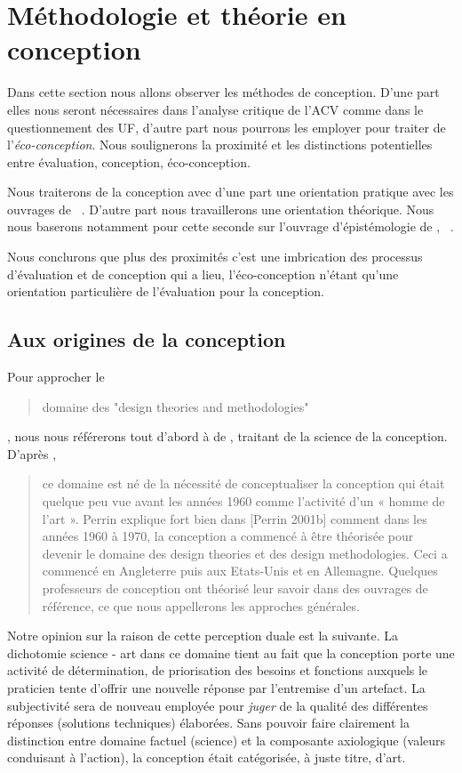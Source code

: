 \section{Méthodologie et théorie en conception}
\label{sec:Méthodologies et théorie de la conception}
Dans cette section nous allons observer les méthodes de conception.
D'une part elles nous seront nécessaires dans l'analyse critique de l'\gls{ACV} comme dans le questionnement des \gls{UF}, d'autre part nous pourrons les employer pour traiter de l'\emph{éco-conception}.
Nous soulignerons la proximité et les distinctions potentielles entre évaluation, conception, éco-conception.

Nous traiterons de la conception avec d'une part une orientation pratique avec les ouvrages de \cite{philippe_taillard_demarche_2010,tassinari_pratique_1997}~\citeauthor{philippe_taillard_demarche_2010,tassinari_pratique_1997}.
D'autre part nous travaillerons une orientation théorique.
Nous nous baserons notamment pour cette seconde sur l'ouvrage d'épistémologie de \citeauthor{micaelli_artificialisme:_2003}, ~\cite{micaelli_artificialisme:_2003}.

Nous conclurons que plus des proximités c'est une imbrication des processus d'évaluation et de conception qui a lieu, l'éco-conception n'étant qu'une orientation particulière de l'évaluation pour la conception.
\subsection{Aux origines de la conception}
Pour approcher le \blockcquote{yannou_preconception_2001}{domaine des "design theories and methodologies"},
nous nous référerons tout d'abord à  de \citeauthor{yannou_preconception_2001}, traitant de la science de la conception.
D'après \citeauthor{yannou_preconception_2001},
\blockcquote{yannou_preconception_2001}{
ce domaine est né de la nécessité de conceptualiser la conception qui était quelque peu vue avant les années 1960 comme l’activité d’un « homme de l’art ».
Perrin explique fort bien dans [Perrin 2001b] comment dans les années 1960 à 1970, la conception a commencé à être théorisée pour devenir le domaine des design theories et des design methodologies. Ceci a commencé en Angleterre puis aux Etats-Unis et en Allemagne.
Quelques professeurs de conception ont théorisé leur savoir dans des ouvrages de référence, ce que nous appellerons les approches générales.
}

Notre opinion sur la raison de cette perception duale est la suivante.
La dichotomie science - art dans ce domaine tient au fait que la conception porte une activité de détermination, de priorisation des besoins et fonctions auxquels le praticien tente d'offrir une nouvelle réponse par l'entremise d'un artefact.
La subjectivité sera de nouveau employée pour \emph{juger} de la qualité des différentes réponses (solutions techniques) élaborées.
Sans pouvoir faire clairement la distinction entre domaine factuel (science) et la composante axiologique (valeurs conduisant à l'action), la conception était catégorisée, à juste titre, d'art. 

